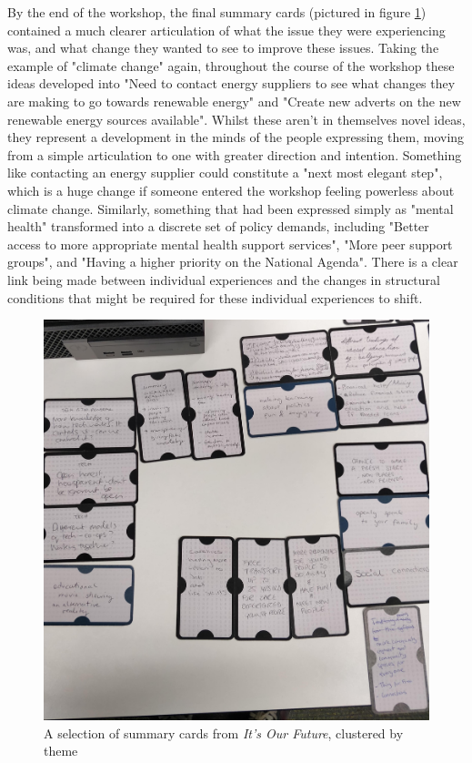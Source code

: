 By  the end of the workshop, the final summary cards (pictured in figure \ref{fig:summary-cards-eg}) contained a much clearer articulation of what the issue they were experiencing was, and what change they wanted to see to improve these issues. Taking the example of "climate change" again, throughout the course of the workshop these ideas developed into "Need to contact energy suppliers to see what changes they are making to go towards renewable energy" and "Create new adverts on the new renewable energy sources available". Whilst these aren't in themselves novel ideas, they represent a development in the minds of the people expressing them, moving from a simple articulation to one with greater direction and intention. Something like contacting an energy supplier could constitute a "next most elegant step", which is a huge change if someone entered the workshop feeling powerless about climate change. Similarly, something that had been expressed simply as "mental health" transformed into a discrete set of policy demands, including "Better access to more appropriate mental health support services", "More peer support groups", and "Having a higher priority on the National Agenda". There is a clear link being made between individual experiences and the changes in structural conditions that might be required for these individual experiences to shift. 

\begin{figure}
    \centering
    \includegraphics[width=1\linewidth]{Images/7/summary-cards-eg.jpg}
    \caption{A selection of summary cards from \textit{It's Our Future}, clustered by theme}
    \label{fig:summary-cards-eg}
\end{figure}

